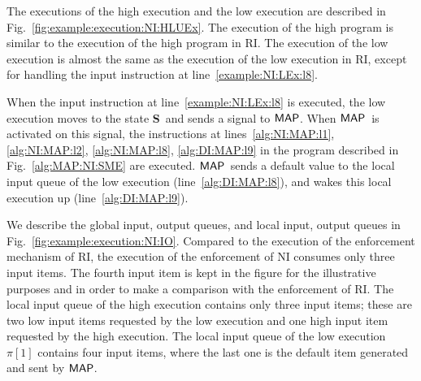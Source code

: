 \documentclass[10pt,a4paper,oneside]{article}
\def\sS{\textbf{S}}
\def\sanserif#1{\ensuremath{\sf #1}}
\def\MAP{\ensuremath{\sanserif{MAP}}}
\def\Prog{\ensuremath{\pi}}
\def\Progl#1{\ensuremath{\Prog[#1]}}
\begin{document}
The executions of the high execution and the low execution are described in Fig.~\ref{fig:example:execution:NI:HLUEx}. The execution of the high program is similar to the execution of the high program in RI. The execution of the low execution is almost the same as the execution of the low execution in RI, except for handling the input instruction at line~\ref{example:NI:LEx:l8}.

When the input instruction at line~\ref{example:NI:LEx:l8} is executed, the low execution moves to the state \sS\ and sends a signal to \MAP. When \MAP\ is activated on this signal, the instructions at lines~\ref{alg:NI:MAP:l1}, \ref{alg:NI:MAP:l2}, \ref{alg:NI:MAP:l8}, \ref{alg:DI:MAP:l9} in the program described in Fig.~\ref{alg:MAP:NI:SME} are executed. \MAP\ sends a default value to the local input queue of the low execution (line~\ref{alg:DI:MAP:l8}), and wakes this local execution up (line~\ref{alg:DI:MAP:l9}).


We describe the global input, output queues, and local input, output queues in Fig.~\ref{fig:example:execution:NI:IO}. Compared to the execution of the enforcement mechanism of RI, the execution of the enforcement of NI consumes only three input items. The fourth input item is kept in the figure for the illustrative purposes and in order to make a comparison with the enforcement of RI. The local input queue of the high execution contains only three input items; these are two low input items requested by the low execution and one high input item requested by the high execution. The local input queue of the low execution \Progl{1} contains four input items, where the last one is the default item generated and sent by \MAP.
\end{document}
